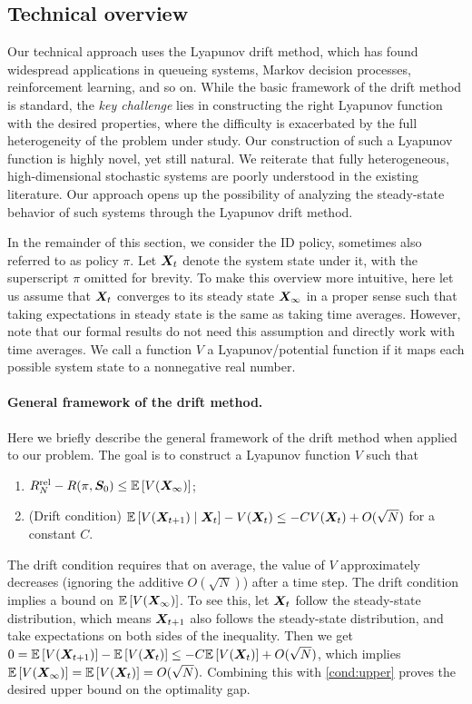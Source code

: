 \documentclass[11pt,letterpaper]{article}
\begin{document}
\subsection*{Technical overview}

Our technical approach uses the Lyapunov drift method, which has found widespread applications in queueing systems, Markov decision processes, reinforcement learning, and so on.
While the basic framework of the drift method is standard, the \emph{key challenge} lies in constructing the right Lyapunov function with the desired properties, where the difficulty is exacerbated by the full heterogeneity of the problem under study.
Our construction of such a Lyapunov function is highly novel, yet still natural.
We reiterate that fully heterogeneous, high-dimensional stochastic systems are poorly understood in the existing literature.
Our approach opens up the possibility of analyzing the steady-state behavior of such systems through the Lyapunov drift method.


In the remainder of this section, we consider the ID policy, sometimes also referred to as policy $\pi$.
Let ${\bm{X}}_t$ denote the system state under it, with the superscript $\pi$ omitted for brevity.
To make this overview more intuitive, here let us assume that ${\bm{X}}_t$ converges to its steady state ${\bm{X}}_{\infty}$ in a proper sense such that taking expectations in steady state is the same as taking time averages.
However, note that our formal results do not need this assumption and directly work with time averages.
We call a function $V$ a Lyapunov/potential function if it maps each possible system state to a nonnegative real number.


\paragraph{General framework of the drift method.}
Here we briefly describe the general framework of the drift method when applied to our problem.
The goal is to construct a Lyapunov function $V$ such that
\begin{enumerate}[label=(\textbf{C\arabic*}),leftmargin=4em]
    \item\label{cond:upper} $R_N^{\textup{rel}}-R(\pi,\bm{S}_0) \le \mathbb{E}\left[V({\bm{X}}_{\infty})\right]$;
    \item\label{cond:drift} (Drift condition) $\mathbb{E}\left[V({\bm{X}}_{t+1})\mid {\bm{X}}_t\right]-V({\bm{X}}_t)\leq -CV({\bm{X}}_t)+ O(\sqrt{N})$ for a constant $C$.
\end{enumerate}
The drift condition requires that on average, the value of $V$ approximately decreases (ignoring the additive $O(\sqrt{N})$) after a time step.
The drift condition implies a bound on $\mathbb{E}\left[V({\bm{X}}_{\infty})\right]$.
To see this, let ${\bm{X}}_t$ follow the steady-state distribution, which means ${\bm{X}}_{t+1}$ also follows the steady-state distribution, and take expectations on both sides of the inequality.
Then we get $0=\mathbb{E}\left[V({\bm{X}}_{t+1})\right]-\mathbb{E}\left[V({\bm{X}}_t)\right]\leq -C\mathbb{E}\left[V({\bm{X}}_t)\right]+ O(\sqrt{N})$, which implies $\mathbb{E}\left[V({\bm{X}}_{\infty})\right]=\mathbb{E}\left[V({\bm{X}}_t)\right]=O(\sqrt{N}).$
Combining this with \ref{cond:upper} proves the desired upper bound on the optimality gap.
\end{document}

